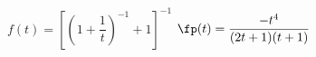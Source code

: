 {$f(t)=\left[\left(1+ \dfrac{1}{t}\right)^{-1} + 1\right]^{-1}$
}
{$\fp(t)=\dfrac{-t^4}{(2t+1)(t+1)}$
}
